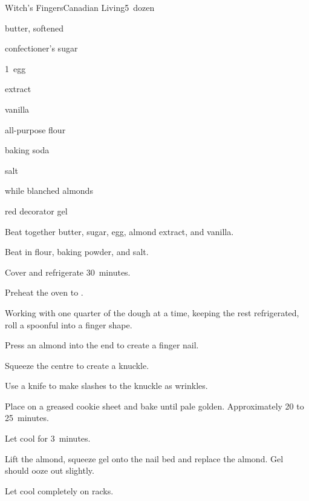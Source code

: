 \begin{recipe}{Witch's Fingers}{Canadian Living}{5~dozen}

\begin{ingredients}
\item {} butter, softened
\item {} confectioner's sugar
\item 1~egg
\item {}  extract
\item {} vanilla
\item \C{2\threequarter} all-purpose flour
\item {} baking soda
\item {} salt
\item \C{\threequarter} while blanched almonds
\item red decorator gel
\end{ingredients}

\begin{directions}
\item Beat together butter, sugar, egg, almond extract, and vanilla.
\item Beat in flour, baking powder, and salt.
\item Cover and refrigerate 30~minutes.
\item Preheat the oven to .
\item Working with one quarter of the dough at a time, keeping the rest refrigerated, roll a spoonful into a finger shape.
\item Press an almond into the end to create a finger nail.
\item Squeeze the centre to create a knuckle.
\item Use a knife to make slashes to the knuckle as wrinkles.
\item Place on a greased cookie sheet and bake until pale golden. Approximately 20 to 25~minutes.
\item Let cool for 3~minutes.
\item Lift the almond, squeeze gel onto the nail bed and replace the almond. Gel should ooze out slightly.
\item Let cool completely on racks.
\end{directions}

\end{recipe}
